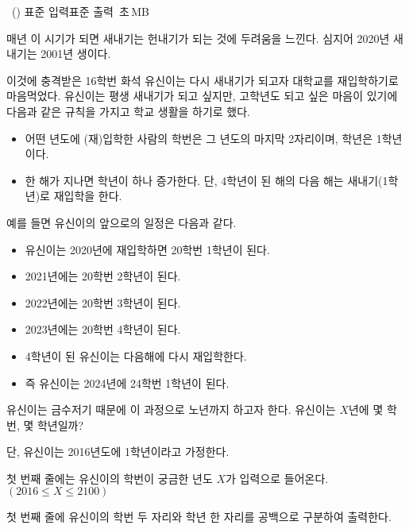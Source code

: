 \begin{problem}{\kcpcprobfirst\ (\kcpcprobfirstshort)}
    {표준 입력}{표준 출력}
    {\kcpcprobfirsttime\,초}{\kcpcprobfirstmemory\,MB}{}
    
    매년 이 시기가 되면 새내기는 헌내기가 되는 것에 두려움을 느낀다. 심지어 2020년 새내기는 2001년 생이다.
    
    이것에 충격받은 16학번 화석 유신이는 다시 새내기가 되고자 대학교를 재입학하기로 마음먹었다.
    유신이는 평생 새내기가 되고 싶지만, 고학년도 되고 싶은 마음이 있기에 다음과 같은 규칙을 가지고 학교 생활을 하기로 했다.
    
    \begin{itemize}
        \item 어떤 년도에 (재)입학한 사람의 학번은 그 년도의 마지막 2자리이며, 학년은 1학년이다.
        \item 한 해가 지나면 학년이 하나 증가한다. 단, 4학년이 된 해의 다음 해는 새내기(1학년)로 재입학을 한다.
    \end{itemize}
    
    예를 들면 유신이의 앞으로의 일정은 다음과 같다.
    
    \begin{itemize}
        \item 유신이는 2020년에 재입학하면 20학번 1학년이 된다.
        \item 2021년에는 20학번 2학년이 된다.
        \item 2022년에는 20학번 3학년이 된다.
        \item 2023년에는 20학번 4학년이 된다.
        \item 4학년이 된 유신이는 다음해에 다시 재입학한다.
        \item 즉 유신이는 2024년에 24학번 1학년이 된다.
    \end{itemize}
    
    유신이는 금수저기 때문에 이 과정으로 노년까지 하고자 한다.
    유신이는 $X$년에 몇 학번, 몇 학년일까?
    
    단, 유신이는 2016년도에 1학년이라고 가정한다.
    
    
    \InputFile
    첫 번째 줄에는 유신이의 학번이 궁금한 년도 $X$가 입력으로 들어온다. $(2016 \leq X \leq 2100)$
    
    \OutputFile
    첫 번째 줄에 유신이의 학번 두 자리와 학년 한 자리를 공백으로 구분하여 출력한다.
    
    \Examples
    \begin{example}
    \end{example}

\end{problem}


